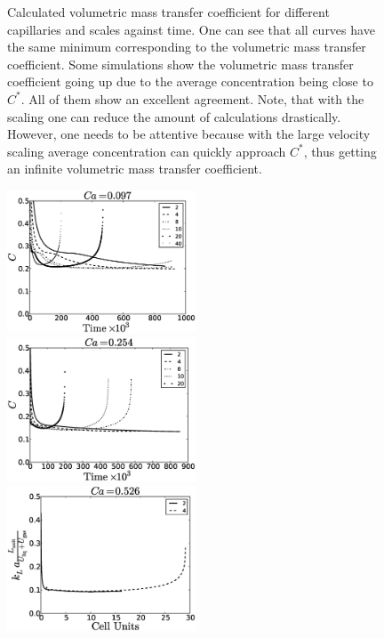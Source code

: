 \documentclass{article}
\newcommand{\cstar}{C^{*}}
\begin{document}
\begin{figure}[htb!]
\caption{Calculated volumetric mass transfer coefficient for different capillaries and scales
against time. One can see
that all curves have the same minimum corresponding to the volumetric mass transfer coefficient.
Some simulations show the volumetric mass transfer coefficient going up due to the average
concentration being close to $\cstar$. All of them show an excellent agreement. Note, that with the
scaling one can reduce the amount of calculations drastically. However, one needs to be attentive
because with the large velocity scaling average concentration can quickly approach $\cstar$, thus
getting an infinite volumetric mass transfer coefficient.
\label{fig:aver:conc:different:capillaries:time}}
\end{figure}
\begin{figure}[htb!]
\includegraphics[width=0.5\textwidth]{Figures/aver_conc_scale_ca097.eps}
\includegraphics[width=0.5\textwidth]{Figures/aver_conc_scale_ca054.eps}\\
\includegraphics[width=0.5\textwidth]{Figures/aver_conc_scale_ca026.eps}

\end{figure}
\end{document}
